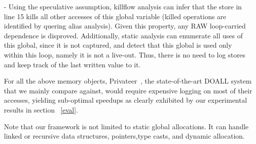 - Using the speculative assumption, killflow analysis can infer that the store
  in line 15 kills all other accesses of this global
variable (killed operations are identified by quering alias analysis). Given this
property, any RAW loop-carried dependence is disproved.  Additionally, static
analysis can enumerate all uses of this global, since it is not captured, and
detect that this global is used only within this loop, namely it is not a
live-out.  Thus, there is no need to log stores and keep track of the last
written value to it.


For all the above memory objects, Privateer~\cite{}, the state-of-the-art DOALL
system that we mainly compare against, would require expensive logging on most
of their accesses,
yielding sub-optimal speedups as clearly exhibited by our experimental results
in section ~\ref{eval}.

Note that our framework is not limited to static global allocations.  It can
handle linked or recursive data structures, pointers,type  casts,  and  dynamic
allocation.






